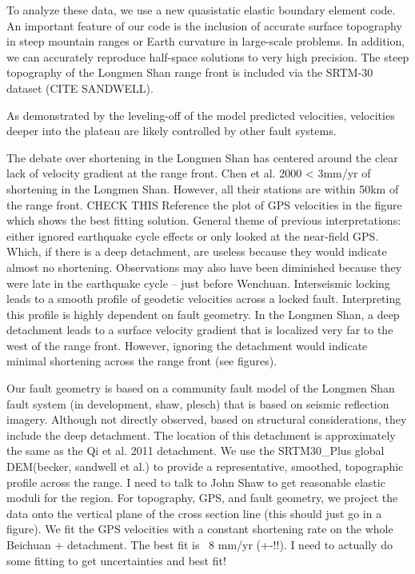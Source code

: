 \documentclass{article}
\begin{document}
To analyze these data, we use a new quasistatic elastic boundary element code.
An important feature of our code is the inclusion of accurate surface topography in steep mountain ranges or Earth curvature in large-scale problems.
In addition, we can accurately reproduce half-space solutions to very high precision. 
The steep topography of the Longmen Shan range front is included via the SRTM-30 dataset (CITE SANDWELL).

As demonstrated by the leveling-off of the model predicted velocities, velocities deeper into the plateau are likely controlled by other fault systems.

The debate over shortening in the Longmen Shan has centered around the clear lack of velocity gradient at the range front. 
Chen et al. 2000 < 3mm/yr of shortening in the Longmen Shan.
However, all their stations are within 50km of the range front. CHECK THIS
Reference the plot of GPS velocities in the figure which shows the best fitting solution.
General theme of previous interpretations: either ignored earthquake cycle effects or only looked at the near-field GPS.
Which, if there is a deep detachment, are useless because they would indicate almost no shortening.
Observations may also have been diminished because they were late in the earthquake cycle – just before Wenchuan.
Interseismic locking leads to a smooth profile of geodetic velocities across a locked fault.
Interpreting this profile is highly dependent on fault geometry.
In the Longmen Shan, a deep detachment leads to a surface velocity gradient that is localized very far to the west of the range front.
However, ignoring the detachment would indicate minimal shortening across the range front (see figures).

Our fault geometry is based on a community fault model of the Longmen Shan fault system (in development, shaw, plesch) that is based on seismic reflection imagery.
Although not directly observed, based on structural considerations, they include the deep detachment.
The location of this detachment is approximately the same as the Qi et al. 2011 detachment. We use the SRTM30\_Plus global DEM(becker, sandwell et al.)  to provide a representative, smoothed, topographic profile across the range. 
I need to talk to John Shaw to get reasonable elastic moduli for the region.
For topography, GPS, and fault geometry, we project the data onto the vertical plane of the cross section line (this should just go in a figure).
We fit the GPS velocities with a constant shortening rate on the whole Beichuan + detachment. The best fit is ~8 mm/yr (+-!!). 
I need to actually do some fitting to get uncertainties and best fit!
\end{document}
